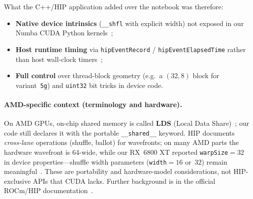\documentclass[11pt,a4paper]{article}
\begin{document}
What the C++/HIP application added over the notebook was therefore:
\begin{itemize}
  \item \textbf{Native device intrinsics} (\texttt{\_\_shfl} with explicit width)
        not exposed in our Numba CUDA Python kernels~\cite{hip-lang-ext};
  \item \textbf{Host runtime timing} via \texttt{hipEventRecord} /
        \texttt{hipEventElapsedTime} rather than host wall-clock
        timers~\cite{hip-events};
  \item \textbf{Full control} over thread-block geometry (e.g.\ a $(32,8)$ block
        for variant~\texttt{5g}) and \texttt{uint32} bit tricks in device code.
\end{itemize}

\paragraph{AMD-specific context (terminology and hardware).}
On AMD GPUs, on-chip shared memory is called \textbf{LDS} (Local Data
Share)~\cite{hip-prog-model}; our code still declares it with the portable
\texttt{\_\_shared\_\_} keyword.
HIP documents \emph{cross-lane} operations (shuffle, ballot) for wavefronts;
on many AMD parts the hardware wavefront is 64-wide, while our RX~6800 XT
reported \texttt{warpSize}${=}32$ in device properties---shuffle width
parameters (\texttt{width}${=}16$ or~$32$) remain meaningful~\cite{hip-lang-ext,hip-faq}.
These are portability and hardware-model considerations, not HIP-exclusive APIs
that CUDA lacks.
Further background is in the official {ROCm}/{HIP} documentation~\cite{hip-docs,rocm-prog-guide,hip-porting}.
\end{document}
